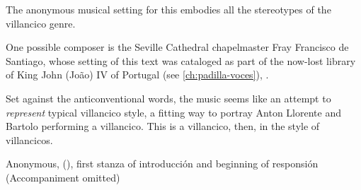 The anonymous musical setting for this embodies all the stereotypes of the
villancico genre.%
\begin{Footnote}
    One possible composer is the Seville Cathedral chapelmaster Fray Francisco
    de Santiago, whose setting of this text was cataloged as part of the
    now-lost library of King John (João) IV of Portugal (see
    \cref{ch:padilla-voces}), 
    \autocite[caixão 26, ]{JohnIV:Catalog}.
\end{Footnote}
Set against the anticonventional words, the music seems like an attempt to
\emph{represent} typical villancico style, a fitting way to portray Anton
Llorente and Bartolo performing a villancico.
This is a villancico, then, in the style of villancicos.

{Anonymous,  (), first
stanza of introducción and beginning of responsión (Accompaniment omitted)}

